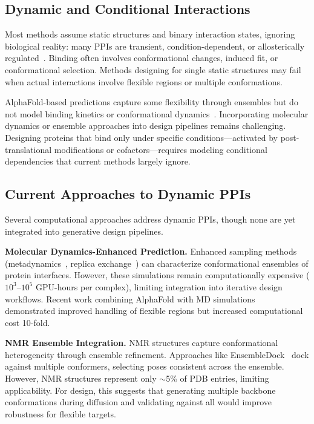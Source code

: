 \subsection{Dynamic and Conditional Interactions}

Most methods assume static structures and binary interaction states, ignoring biological reality: many PPIs are transient, condition-dependent, or allosterically regulated~\cite{mcgary2010dynamic}. Binding often involves conformational changes, induced fit, or conformational selection. Methods designing for single static structures may fail when actual interactions involve flexible regions or multiple conformations.

AlphaFold-based predictions capture some flexibility through ensembles but do not model binding kinetics or conformational dynamics~\cite{abramson2024alphafold3}. Incorporating molecular dynamics or ensemble approaches into design pipelines remains challenging. Designing proteins that bind only under specific conditions---activated by post-translational modifications or cofactors---requires modeling conditional dependencies that current methods largely ignore.

\subsection{Current Approaches to Dynamic PPIs}

Several computational approaches address dynamic PPIs, though none are yet integrated into generative design pipelines.

\textbf{Molecular Dynamics-Enhanced Prediction.} Enhanced sampling methods (metadynamics~\cite{barducci2008metadynamics}, replica exchange~\cite{sugita1999replica}) can characterize conformational ensembles of protein interfaces. However, these simulations remain computationally expensive ($10^3$--$10^5$ GPU-hours per complex), limiting integration into iterative design workflows. Recent work combining AlphaFold with MD simulations~\cite{bezrodniy2024alphafoldmd} demonstrated improved handling of flexible regions but increased computational cost 10-fold.

\textbf{NMR Ensemble Integration.} NMR structures capture conformational heterogeneity through ensemble refinement. Approaches like EnsembleDock~\cite{bolstad2003ensembledock} dock against multiple conformers, selecting poses consistent across the ensemble. However, NMR structures represent only $\sim$5\% of PDB entries, limiting applicability. For design, this suggests that generating multiple backbone conformations during diffusion and validating against all would improve robustness for flexible targets.

